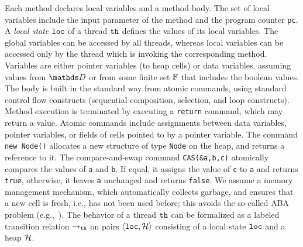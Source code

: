 %
Each method declares local variables and a method body.
%
The set of local variables include the input parameter of the method and
the program counter {\tt pc}.
A {\it local state} ${\tt loc}$ of a thread ${\tt th}$
defines  the values of its local variables.
The global variables can be
accessed by all threads, whereas local variables can be accessed only
by the thread which is invoking the corresponding method.
Variables are either pointer variables (to heap cells) or data variables, assuming values from $\ddomain$ or from some finite set $\mathbb{F}$ that includes the boolean values.
%
%
%
The body is built in the standard way
from atomic commands, using standard control
flow constructs (sequential composition, selection, and loop constructs).
%
%
%
Method execution is terminated by executing a {\tt return} command,
which may return a value.
%
Atomic commands include assignments between data variables, 
pointer variables, or fields of cells pointed to by a pointer variable.
%
The command {\tt new Node()} allocates a new structure of type
{\tt Node} on the heap, and returns a reference to it.
%
The compare-and-swap command {\tt CAS(\&a,b,c)} atomically
compares the values of {\tt a} and {\tt b}.
If  equal, it assigns the value of
{\tt c} to {\tt a}  and returns {\tt true}, 
otherwise, it leaves {\tt a} unchanged and returns {\tt false}. 
We assume a memory management mechanism, which automatically collects
garbage, and ensures that a new cell is fresh, i.e., has
not been used before; this avoids the so-called
ABA problem (e.g.,~\cite{MS:QueueAlgorithms}).
%
The behavior of a thread ${\tt th}$ can be formalized as 
a labeled transition relation ${\xrightarrow{}{}}_{\!\!{\tt th}}$
on pairs $\left\langle{\tt loc},{\mathcal H}\right\rangle$ consisting of a local state
${\tt loc}$ and a heap ${\mathcal H}$.

